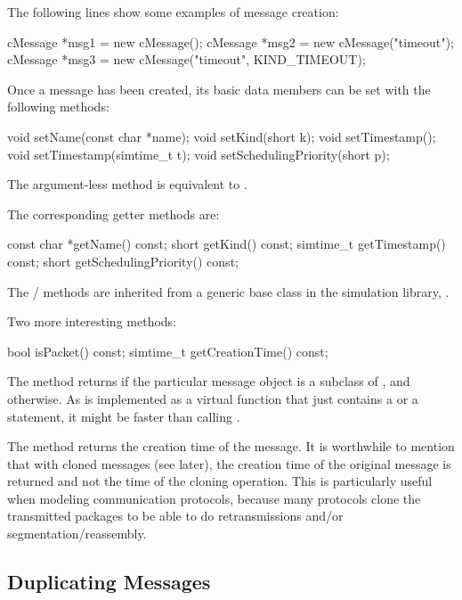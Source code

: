 The following lines show some examples of message creation:

\begin{cpp}
cMessage *msg1 = new cMessage();
cMessage *msg2 = new cMessage("timeout");
cMessage *msg3 = new cMessage("timeout", KIND_TIMEOUT);
\end{cpp}

Once a message has been created, its basic data members can be set
with the following methods:

\begin{cpp}
void setName(const char *name);
void setKind(short k);
void setTimestamp();
void setTimestamp(simtime_t t);
void setSchedulingPriority(short p);
\end{cpp}

The argument-less  method is equivalent to
.

The corresponding getter methods are:

\begin{cpp}
const char *getName() const;
short getKind() const;
simtime_t getTimestamp() const;
short getSchedulingPriority() const;
\end{cpp}

The / methods are inherited from
a generic base class in the simulation library, .

Two more interesting methods:

\begin{cpp}
bool isPacket() const;
simtime_t getCreationTime() const;
\end{cpp}

The  method returns  if the particular message
object is a subclass of , and  otherwise. As
 is implemented as a virtual function that just contains
a  or a  statement, it might be faster
than calling .

The  method returns the creation time of the
message. It is worthwhile to mention that with cloned messages (see
 later), the creation time of the original message is returned
and not the time of the cloning operation. This is particularly useful when
modeling communication protocols, because many protocols clone the
transmitted packages to be able to do retransmissions and/or
segmentation/reassembly.


\subsection{Duplicating Messages}
\label{sec:messages:duplicating-messages}

